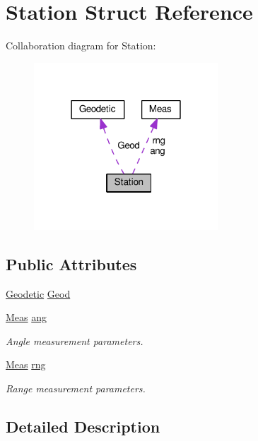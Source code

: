 \hypertarget{structStation}{\section{Station Struct Reference}
\label{structStation}
}


Collaboration diagram for Station\-:\nopagebreak
\begin{figure}[H]
\begin{center}
\leavevmode
\includegraphics[width=195pt]{structStation__coll__graph}
\end{center}
\end{figure}
\subsection*{Public Attributes}
\begin{DoxyCompactItemize}
\item 
\hyperlink{classGeodetic}{Geodetic} \hyperlink{structStation_a2c17c2bc76b0dbfb01d7305e160c5b6c}{Geod}
\item 
\hyperlink{structMeas}{Meas} \hyperlink{structStation_a378712bc67f1ca9fe2df21381892143f}{ang}
\begin{DoxyCompactList}\small\item\em Angle measurement parameters. \end{DoxyCompactList}\item 
\hyperlink{structMeas}{Meas} \hyperlink{structStation_a5a4dc5853a9776ddb69bed6b8bcab1a2}{rng}
\begin{DoxyCompactList}\small\item\em Range measurement parameters. \end{DoxyCompactList}\end{DoxyCompactItemize}


\subsection{Detailed Description}


